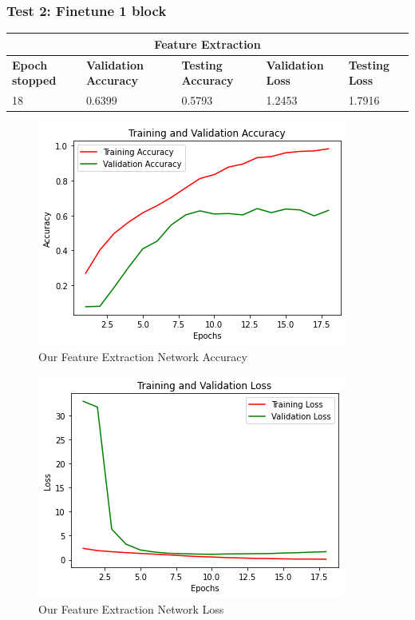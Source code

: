 \subsubsection{Test 2: Finetune 1 block}

\begin{tabular}{ |p{2cm}|p{2cm}|p{2cm}|p{2cm}|p{2cm}|  }
\hline
\multicolumn{5}{|c|}{Feature Extraction} \\
\hline
\textbf{Epoch stopped} & \textbf{Validation Accuracy} & \textbf{Testing Accuracy} & \textbf{Validation Loss} & \textbf{Testing Loss} \\
\hline
18 & 0.6399 & 0.5793 & 1.2453 & 1.7916\\
\hline
\end{tabular}

\begin{figure}[H]
	\centering
	\includegraphics[height=0.45\textwidth]{img/resnet50v2/resnet50finetuned1acc.png}
	\caption{Our Feature Extraction Network Accuracy}
	\label{fig:resnet50finetuned1acc}
\end{figure}

\begin{figure}[H]
	\centering
	\includegraphics[height=0.45\textwidth]{img/resnet50v2/resnet50finetuned1loss.png}
	\caption{Our Feature Extraction Network Loss}
	\label{fig:resnet50finetuned1loss}
\end{figure}

